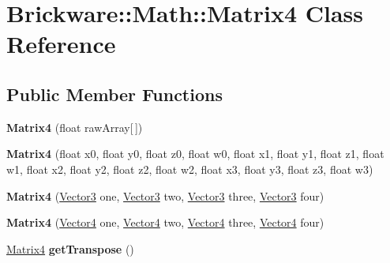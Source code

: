 \hypertarget{classBrickware_1_1Math_1_1Matrix4}{}\section{Brickware\+:\+:Math\+:\+:Matrix4 Class Reference}
\label{classBrickware_1_1Math_1_1Matrix4}
\subsection*{Public Member Functions}
\begin{DoxyCompactItemize}
\item 
\hypertarget{classBrickware_1_1Math_1_1Matrix4_acd10c1dd069d860b9960c4ac9cdf72c6}{}{\bfseries Matrix4} (float raw\+Array\mbox{[}$\,$\mbox{]})\label{classBrickware_1_1Math_1_1Matrix4_acd10c1dd069d860b9960c4ac9cdf72c6}

\item 
\hypertarget{classBrickware_1_1Math_1_1Matrix4_a09eab6d413ad9d6302003f9285859677}{}{\bfseries Matrix4} (float x0, float y0, float z0, float w0, float x1, float y1, float z1, float w1, float x2, float y2, float z2, float w2, float x3, float y3, float z3, float w3)\label{classBrickware_1_1Math_1_1Matrix4_a09eab6d413ad9d6302003f9285859677}

\item 
\hypertarget{classBrickware_1_1Math_1_1Matrix4_a82b4f3f0d4f72a14e9e2c32374a432d6}{}{\bfseries Matrix4} (\hyperlink{classBrickware_1_1Math_1_1Vector3}{Vector3} one, \hyperlink{classBrickware_1_1Math_1_1Vector3}{Vector3} two, \hyperlink{classBrickware_1_1Math_1_1Vector3}{Vector3} three, \hyperlink{classBrickware_1_1Math_1_1Vector3}{Vector3} four)\label{classBrickware_1_1Math_1_1Matrix4_a82b4f3f0d4f72a14e9e2c32374a432d6}

\item 
\hypertarget{classBrickware_1_1Math_1_1Matrix4_a0676295de9550c848f0fc0fd1e5f898c}{}{\bfseries Matrix4} (\hyperlink{classBrickware_1_1Math_1_1Vector4}{Vector4} one, \hyperlink{classBrickware_1_1Math_1_1Vector4}{Vector4} two, \hyperlink{classBrickware_1_1Math_1_1Vector4}{Vector4} three, \hyperlink{classBrickware_1_1Math_1_1Vector4}{Vector4} four)\label{classBrickware_1_1Math_1_1Matrix4_a0676295de9550c848f0fc0fd1e5f898c}

\item 
\hypertarget{classBrickware_1_1Math_1_1Matrix4_a7545072fedfa3afc18750c7443f0f810}{}\hyperlink{classBrickware_1_1Math_1_1Matrix4}{Matrix4} {\bfseries get\+Transpose} ()\label{classBrickware_1_1Math_1_1Matrix4_a7545072fedfa3afc18750c7443f0f810}


\end{DoxyCompactItemize}
